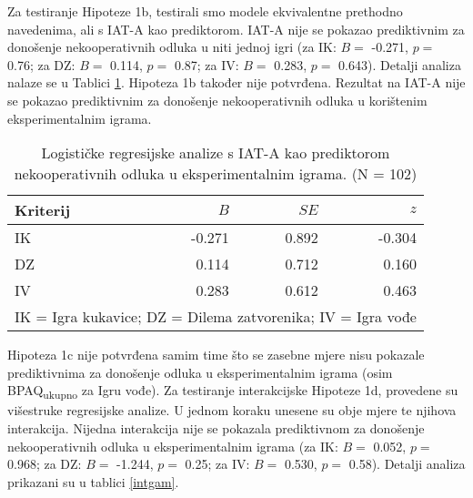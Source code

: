 \documentclass[a4paper, 12pt]{report}
\begin{document}
Za testiranje Hipoteze 1b, testirali smo modele ekvivalentne prethodno
navedenima, ali s IAT-A kao prediktorom. IAT-A nije se pokazao prediktivnim za
donošenje nekooperativnih odluka u niti jednoj igri (za IK: $B =$ -0.271, $p =$
0.76; za DZ: $B =$ 0.114, $p =$ 0.87; za IV: $B =$ 0.283, $p =$ 0.643). Detalji analiza nalaze se u
Tablici \ref{bivargamimp}. Hipoteza 1b također nije potvrđena. Rezultat na IAT-A
nije se pokazao prediktivnim za donošenje nekooperativnih odluka u korištenim
eksperimentalnim igrama.

\begin{table}
    \begin{center}
        \caption{\label{bivargamimp} Logističke regresijske analize s
            IAT-A kao prediktorom nekooperativnih odluka u
            eksperimentalnim igrama. (N = 102)}
        \hspace*{-0.7cm}\begin{tabular}{lrrr}
        \toprule
        Kriterij & $B$ & $SE$ & $z$ \\
        \midrule
        IK & -0.271 & 0.892 & -0.304 \\
        DZ & 0.114 & 0.712 & 0.160 \\
        IV & 0.283 & 0.612 & 0.463 \\
        \bottomrule
        \multicolumn{4}{l}{
            \parbox{5cm}{\scriptsize \vspace{3pt} 
                IK = Igra kukavice; DZ = Dilema zatvorenika; IV = Igra vođe
        }}
    \end{tabular}
\end{center}
\end{table}

Hipoteza 1c nije potvrđena samim time što se zasebne mjere nisu pokazale
prediktivnima za donošenje odluka u eksperimentalnim igrama (osim
BPAQ\textsubscript{ukupno} za Igru vođe). Za testiranje interakcijske Hipoteze
1d, provedene su  višestruke regresijske analize. U jednom koraku unesene su
obje mjere te njihova interakcija. Nijedna interakcija nije se pokazala
prediktivnom za donošenje nekooperativnih odluka u eksperimentalnim igrama (za
IK: $B =$ 0.052, $p =$ 0.968; za DZ: $B =$ -1.244, $p =$ 0.25; za IV: $B =$
0.530, $p =$ 0.58). Detalji analiza prikazani su u tablici \ref{intgam}.
\end{document}
